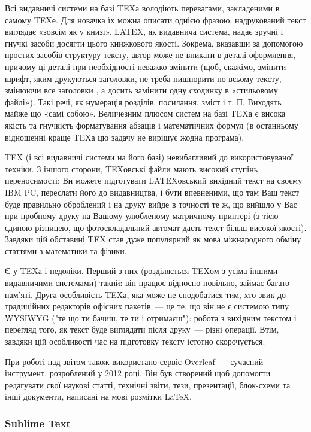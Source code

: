 Всі видавничі системи на базі TEXа володіють перевагами, закладеними в самому TEXе. Для новачка їх можна описати однією фразою: надрукований текст виглядає «зовсім як у книзі». LATEX, як видавнича система, надає зручні і гнучкі засоби досягти цього книжкового якості. Зокрема, вказавши за допомогою простих засобів структуру тексту, автор може не вникати в деталі оформлення, причому ці деталі при необхідності неважко змінити (щоб, скажімо, змінити шрифт, яким друкуються заголовки, не треба нишпорити по всьому тексту, змінюючи все заголовки , а досить замінити одну сходинку в «стильовому файлі»). Такі речі, як нумерація розділів, посилання, зміст і т. П. Виходять майже що «самі собою». Величезним плюсом систем на базі TEXа є висока якість та гнучкість форматування абзаців і математичних формул (в останньому відношенні краще TEXа цю задачу не вирішує жодна програма).

TEX (і всі видавничі системи на його базі) невибагливий до використовуваної техніки. З іншого сторони, TEXовські файли мають високий ступінь переносимості: Ви можете підготувати LATEXовський вихідний текст на своєму IBM PC, переслати його до видавництва, і бути впевненими, що там Ваш текст буде правильно оброблений і на друку вийде в точності те ж, що вийшло у Вас при пробному друку на Вашому улюбленому матричному принтері (з тією єдиною різницею, що фотоскладальний автомат дасть текст більш високої якості). Завдяки цій обставині TEX став дуже популярний як мова міжнародного обміну статтями з математики та фізики.

Є у TEXа і недоліки. Перший з них (розділяється TEXом з усіма іншими видавничими системами) такий: він працює відносно повільно, займає багато пам'яті. Друга особливість TEXа, яка може не сподобатися тим, хто звик до традиційних редакторів офісних пакетів~--- це те, що він не є системою типу WYSIWYG ("те що ти бачиш, те ти і отримаєш"): робота з вихідним текстом і перегляд того, як текст буде виглядати після друку~--- різні операції. Втім, завдяки цій особливості час на підготовку тексту істотно скорочується.

При роботі над звітом також використано сервіс Overleaf~--- сучасний інструмент, розроблений у 2012 році. Він був створений щоб допомогти редагувати свої наукові статті, технічні звіти, тези, презентації, блок-схеми та інші документи, написані на мові розмітки LaTeX. 

\subsubsection{Sublime Text}

